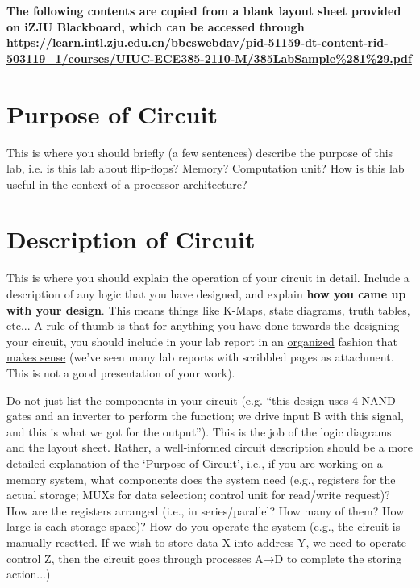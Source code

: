 \documentclass[12pt, a4paper]{article}
\begin{document}
    \maketitlepage

    {\bfseries The following contents are copied from a blank layout sheet provided on iZJU Blackboard, which can be accessed through \url{https://learn.intl.zju.edu.cn/bbcswebdav/pid-51159-dt-content-rid-503119_1/courses/UIUC-ECE385-2110-M/385LabSample%281%29.pdf} }

    \section{Purpose of Circuit}
    This is where you should briefly (a few sentences) describe the purpose of this lab, i.e. is 
    this lab about flip-flops? Memory? Computation unit? How is this lab useful in the 
    context of a processor architecture?

    \section{Description of Circuit}
    This is where you should explain the operation of your circuit in detail. Include a 
    description of any logic that you have designed, and explain \textbf{how you came up with 
    your design}. This means things like K-Maps, state diagrams, truth tables, etc... A rule 
    of thumb is that for anything you have done towards the designing your circuit, you 
    should include in your lab report in an \underline{organized} fashion that \underline{makes sense} (we've seen 
    many lab reports with scribbled pages as attachment. This is not a good presentation of 
    your work).

    Do not just list the components in your circuit (e.g. ``this design uses 4 NAND gates and 
    an inverter to perform the function; we drive input B with this signal, and this is what we 
    got for the output''). This is the job of the logic diagrams and the layout sheet. Rather, a 
    well-informed circuit description should be a more detailed explanation of the `Purpose 
    of Circuit', i.e., if you are working on a memory system, what components does the 
    system need (e.g., registers for the actual storage; MUXs for data selection; control unit 
    for read/write request)? How are the registers arranged (i.e., in series/parallel? How 
    many of them? How large is each storage space)? How do you operate the system (e.g., 
    the circuit is manually resetted. If we wish to store data X into address Y, we need to 
    operate control Z, then the circuit goes through processes A→D to complete the storing 
    action...)
\end{document}
